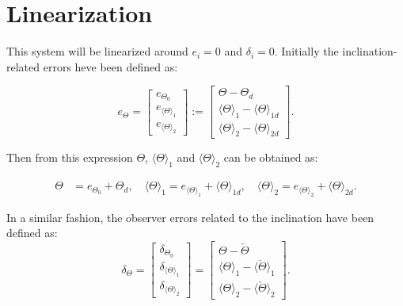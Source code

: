 \documentclass[main.tex]{subfiles}
\begin{document}
	\newpage

	\section{Linearization}
	
	This system will be linearized around $e_i = 0$ and $\delta_i = 0$. Initially the inclination-related errors heve been defined as:
	
	
	\begin{equation}
	e_\Theta = \begin{bmatrix}
	e_{\Theta_0} \\
	e_{\langle \Theta \rangle_1} \\
	e_{\langle \Theta \rangle_2}
	\end{bmatrix} := \begin{bmatrix}
	\Theta - \Theta_d \\
	\langle \Theta \rangle_1 - \langle \Theta \rangle_{1d} \\
	\langle \Theta \rangle_2 - \langle \Theta \rangle_{2d} 
	\end{bmatrix}.
	\end{equation}
	
	Then from this expression $\Theta$, $\langle \Theta \rangle_1$ and $\langle \Theta \rangle_2 $ can be obtained as:
	
	\begin{align}
	\Theta &= e_{\Theta_0} + \Theta_d,\quad \langle \Theta \rangle_1 = e_{\langle \Theta \rangle_1} + \langle \Theta \rangle_{1d},\quad \langle \Theta \rangle_2 = e_{\langle \Theta \rangle_2} + \langle \Theta \rangle_{2d}.
	\label{eq:theta}
	\end{align}
	
	In a similar fashion, the observer errors related to the inclination have been defined as:
	\begin{equation}
	\delta_\Theta = \begin{bmatrix}
	\delta_{\Theta_0} \\
	\delta_{\langle \Theta \rangle_1} \\
	\delta_{\langle \Theta \rangle_2}
	\end{bmatrix} = \begin{bmatrix}
	\Theta - \check{\Theta} \\
	\langle \Theta \rangle_1 - \langle \check{\Theta} \rangle_{1} \\
	\langle \Theta \rangle_2 - \langle \check{\Theta} \rangle_{2} 
	\end{bmatrix}.
	\label{eq:observererror}
	\end{equation}
	
\end{document}
